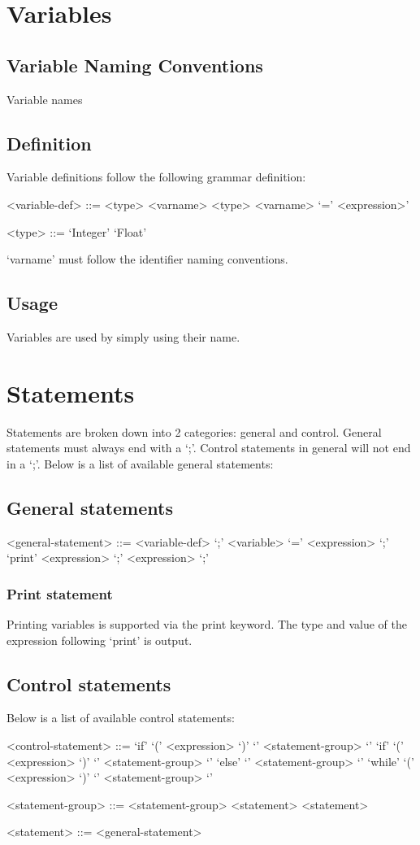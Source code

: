 \documentclass{standalone}
\begin{document}
	\section{Variables}
		\subsection{Variable Naming Conventions}
			Variable names
		\subsection{Definition}
			Variable definitions follow the following grammar definition:
			\begin{grammar}
				<variable-def> ::= <type> <varname>
					\alt <type> <varname> `=' <expression>'

				<type> ::= `Integer'
					\alt `Float'
			\end{grammar}
			`varname' must follow the identifier naming conventions.
		\subsection{Usage}
			Variables are used by simply using their name.
	
	\section{Statements}
		Statements are broken down into 2 categories: general and control. General statements must always end with a `;'. Control statements in general will not end in a `;'.
		Below is a list of available general statements:
		\subsection{General statements}
		\begin{grammar}
			<general-statement> ::= <variable-def> `;'
				\alt <variable> `=' <expression> `;'
				\alt `print' <expression> `;'
				 `;'
		\end{grammar}
		\subsubsection{Print statement}
			Printing variables is supported via the print keyword. The type and value of the expression following `print' is output.

		\subsection{Control statements}
		Below is a list of available control statements:
		\begin{grammar}
			<control-statement> ::= 
				`if' `(' <expression> `)' `{' <statement-group> `}'
				\alt `if' `(' <expression> `)' `{' <statement-group> `}' `else' `{' <statement-group> `}'
				\alt `while' `(' <expression> `)' `{' <statement-group> `}'
		
			<statement-group> ::= <statement-group> <statement>

			<statement> ::= <general-statement>
				\alt <control-statement>
	
		\end{grammar}
\end{document}
